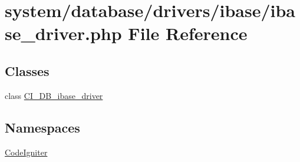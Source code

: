 \hypertarget{ibase__driver_8php}{}\section{system/database/drivers/ibase/ibase\+\_\+driver.php File Reference}
\label{ibase__driver_8php}
\subsection*{Classes}
\begin{DoxyCompactItemize}
\item 
class \mbox{\hyperlink{class_c_i___d_b__ibase__driver}{C\+I\+\_\+\+D\+B\+\_\+ibase\+\_\+driver}}
\end{DoxyCompactItemize}
\subsection*{Namespaces}
\begin{DoxyCompactItemize}
\item 
 \mbox{\hyperlink{namespace_code_igniter}{Code\+Igniter}}
\end{DoxyCompactItemize}
